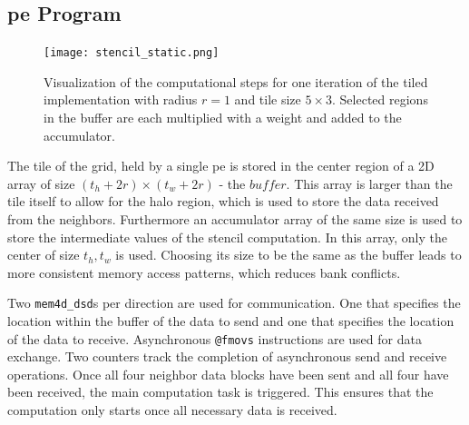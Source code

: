 \subsection{\ac{pe} Program}


\begin{figure}
    \centering
    \texttt{[image: stencil\_static.png]}
    \caption{Visualization of the computational steps for one iteration of the tiled implementation with radius $r=1$ and tile size $5\times 3$. Selected regions in the buffer are each multiplied with a weight and added to the accumulator.}
    \label{fig:stencil_algorithm_animation}
\end{figure}

The tile of the grid, held by a single \ac{pe} is stored in the center region of a 2D array of size $(t_h+2r)\times (t_w+2r)$ - the $buffer$. This array is larger than the tile itself to allow for the halo region, which is used to store the data received from the neighbors. Furthermore an accumulator array of the same size is used to store the intermediate values of the stencil computation. In this array, only the center of size $t_h, t_w$ is used. Choosing its size to be the same as the buffer leads to more consistent memory access patterns, which reduces bank conflicts.

Two \texttt{mem4d\_dsd}s per direction are used for communication. One that specifies the location within the buffer of the data to send and one that specifies the location of the data to receive.
Asynchronous \texttt{@fmovs} instructions are used for data exchange. Two counters track the completion of asynchronous send and receive operations. Once all four neighbor data blocks have been sent and all four have been received, the main computation task is triggered. This ensures that the computation only starts once all necessary data is received.

